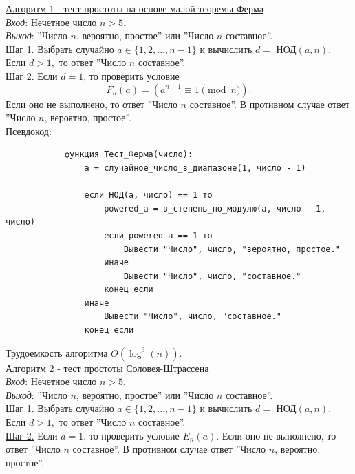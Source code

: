 \documentclass[bachelor, och, labwork]{shiza}
\begin{document}
        \underline{Алгоритм 1 - тест простоты на основе малой теоремы Ферма}\\
            \textit{Вход}: Нечетное число $n > 5$.\\
            \textit{Выход}: ''Число $n$, вероятно, простое'' или ''Число $n$ составное''.\\
            \underline{Шаг 1.} Выбрать случайно $a \in \{1, 2, \dots, n - 1\}$ и
            вычислить $d = $ НОД$(a, n).$ Если $d > 1,$ то ответ ''Число $n$ составное''.\\
            \underline{Шаг 2.} Если $d = 1$, то проверить условие
            $$F_n (a) = (a^{n - 1} \equiv 1 \pmod n).$$ Если оно не выполнено,
            то ответ ''Число $n$ составное''. В противном случае ответ ''Число
            $n$, вероятно, простое''.\\
            
        \underline{Псевдокод:}
            \begin{verbatim}
            функция Тест_Ферма(число):
                a = случайное_число_в_диапазоне(1, число - 1)
            
                если НОД(a, число) == 1 то
                    powered_a = в_степень_по_модулю(a, число - 1, число)
                    если powered_a == 1 то
                        Вывести "Число", число, "вероятно, простое."
                    иначе
                        Вывести "Число", число, "составное."
                    конец если
                иначе
                    Вывести "Число", число, "составное."
                конец если              
            \end{verbatim}

            Трудоемкость алгоритма $O(\log^3(n))$.\\

        \underline{Алгоритм 2 - тест простоты Соловея-Штрассена}\\
            \textit{Вход}: Нечетное число $n > 5$.\\
            \textit{Выход}: ''Число $n$, вероятно, простое'' или ''Число $n$ составное''.\\
            \underline{Шаг 1.} Выбрать случайно $a \in \{1, 2, \dots, n - 1\}$ и
            вычислить $d = $ НОД$(a, n).$ Если $d > 1,$ то ответ ''Число $n$ составное''.\\
            \underline{Шаг 2.} Если $d = 1$, то проверить условие $E_n (a)$.
            Если оно не выполнено, то ответ ''Число $n$ составное''. В противном
            случае ответ ''Число $n$, вероятно, простое''.\\
            
\end{document}
